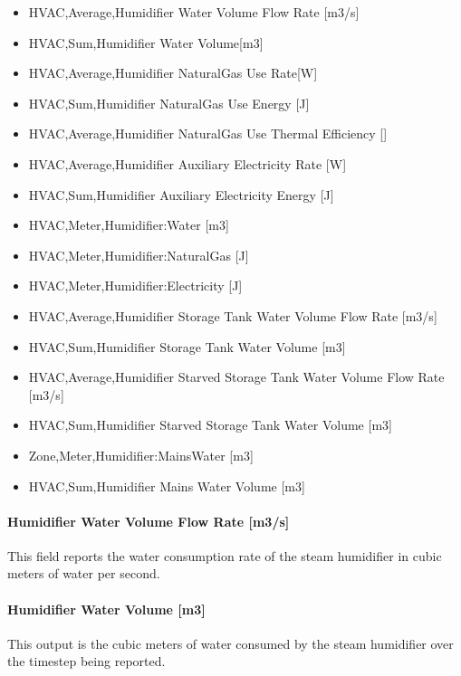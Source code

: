 \begin{itemize}
\tightlist
\item
  HVAC,Average,Humidifier Water Volume Flow Rate {[}m3/s{]}
\item
  HVAC,Sum,Humidifier Water Volume{[}m3{]}
\item
  HVAC,Average,Humidifier NaturalGas Use Rate{[}W{]}
\item
  HVAC,Sum,Humidifier NaturalGas Use Energy {[}J{]}
 \item
  HVAC,Average,Humidifier NaturalGas Use Thermal Efficiency {[}{]}
\item
  HVAC,Average,Humidifier Auxiliary Electricity Rate {[}W{]}
\item
  HVAC,Sum,Humidifier Auxiliary Electricity Energy {[}J{]}
\item
  HVAC,Meter,Humidifier:Water {[}m3{]}
\item
  HVAC,Meter,Humidifier:NaturalGas {[}J{]}
\item
  HVAC,Meter,Humidifier:Electricity {[}J{]}
\item
  HVAC,Average,Humidifier Storage Tank Water Volume Flow Rate {[}m3/s{]}
\item
  HVAC,Sum,Humidifier Storage Tank Water Volume {[}m3{]}
\item
  HVAC,Average,Humidifier Starved Storage Tank Water Volume Flow Rate {[}m3/s{]}
\item
  HVAC,Sum,Humidifier Starved Storage Tank Water Volume {[}m3{]}
\item
  Zone,Meter,Humidifier:MainsWater {[}m3{]}
\item
  HVAC,Sum,Humidifier Mains Water Volume {[}m3{]}
\end{itemize}

\paragraph{Humidifier Water Volume Flow Rate {[}m3/s{]}}\label{humidifier-water-volume-flow-rate-m3s-1}

This field reports the water consumption rate of the steam humidifier in cubic meters of water per second.

\paragraph{Humidifier Water Volume {[}m3{]}}\label{humidifier-water-volume-m3}

This output is the cubic meters of water consumed by the steam humidifier over the timestep being reported.

